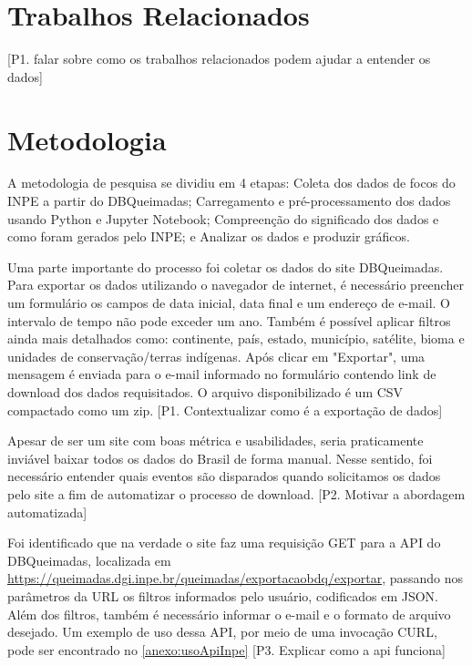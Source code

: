 \documentclass[cic,tc]{iiufrgs}
\begin{document}

\chapter{Trabalhos Relacionados}

[P1. falar sobre como os trabalhos relacionados podem ajudar a entender 
os dados] \par



\chapter{Metodologia}

A metodologia de pesquisa se dividiu em 4 etapas: Coleta dos dados de focos do 
INPE a partir do DBQueimadas; Carregamento e pré-processamento dos dados usando 
Python e Jupyter Notebook; Compreenção do significado dos dados e como foram gerados 
pelo INPE; e Analizar os dados e produzir gráficos. \par



Uma parte importante do processo foi coletar os dados do site DBQueimadas. 
Para exportar os dados utilizando o navegador de internet, é necessário 
preencher um formulário os campos de data inicial,
data final e um endereço de e-mail. O intervalo de tempo não 
pode exceder um ano. Também é possível aplicar filtros ainda mais 
detalhados como: continente, país, estado, município, satélite, bioma e 
unidades de conservação/terras indígenas. Após clicar em "Exportar", 
uma mensagem é enviada para o e-mail informado no formulário contendo link de 
download dos dados requisitados. O arquivo disponibilizado é um CSV compactado 
como um zip. [P1. Contextualizar como é a exportação de dados]\par

Apesar de ser um site com boas métrica e usabilidades, seria praticamente 
inviável baixar todos os dados do Brasil de forma manual. Nesse sentido, 
foi necessário entender quais eventos são disparados quando solicitamos 
os dados pelo site a fim de automatizar o processo de download. 
[P2. Motivar a abordagem automatizada] \par

Foi identificado que na verdade o site faz uma requisição GET para a API do 
DBQueimadas, localizada em 
\url{https://queimadas.dgi.inpe.br/queimadas/exportacaobdq/exportar}, 
passando nos parâmetros da URL os filtros informados pelo usuário, codificados 
em JSON. Além dos filtros, também é necessário informar o e-mail e o formato 
de arquivo desejado. Um exemplo de uso dessa API, por meio de uma invocação CURL, 
pode ser encontrado no \ref{anexo:usoApiInpe} [P3. Explicar como a api funciona]
\end{document}
